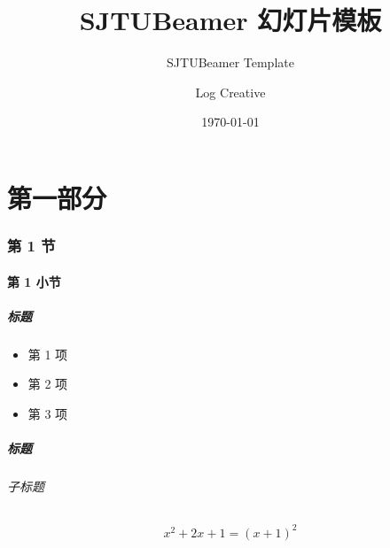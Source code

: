 \documentclass[
    aspectratio=169,                   %
]{beamer}
\institute[School of Mathematical Sciences]{数学科学学院}   %
\title{\textsf{SJTUBeamer} 幻灯片模板}  %
\subtitle{SJTUBeamer Template}         %
\author{Log Creative}                  %
\date{\today}                          %
\begin{document}
    \maketitle                         %

\part{第一部分}


\AtBeginSubsection[]{                  %
    \begin{frame}
        \subsectionpage                %
    \end{frame}
}

\section{第 1 节}
\subsection{第 1 小节}

    \begin{frame}
        \frametitle{标题}

        \begin{itemize}
            \item 第 1 项
            \item 第 2 项
            \item 第 3 项
        \end{itemize}

    \end{frame}

    \begin{frame}
        \frametitle{标题}
        \framesubtitle{子标题}

        \begin{equation}
            x^2+2x+1=(x+1)^2
        \end{equation}
        
    \end{frame}
\end{document}
